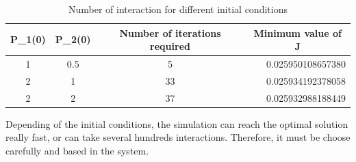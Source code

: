 \documentclass{article}
\begin{document}
\begin{table}[H]
\centering
\caption{Number of interaction for different initial conditions}
\label{my-label}
\begin{tabular}{cccr} \hline
P\_1(0) & P\_2(0) & Number of iterations required & \multicolumn{1}{c}{Minimum value of J} \\ \hline
1       & 0.5     & 5                             & 0.025950108657380                      \\
2       & 1       & 33                            & 0.025934192378058                      \\
2       & 2       & 37                            & 0.025932988188449                     \\
\hline
\end{tabular}
\end{table}

Depending of the initial conditions, the simulation can reach the optimal solution really fast, or can take several hundreds interactions. Therefore, it must be choose carefully and based in the system.
\end{document}

